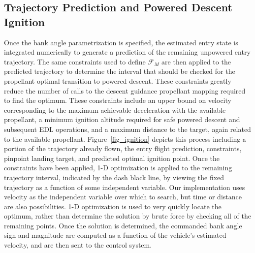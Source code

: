 \documentclass[letterpaper, preprint, paper,11pt]{AAS}
\begin{document}
\subsection{Trajectory Prediction and Powered Descent Ignition}
Once the bank angle parametrization is specified, the estimated entry state is integrated numerically to generate a prediction of the remaining unpowered entry trajectory. The same constraints used to define $\mathcal{F}_M$ are then applied to the predicted trajectory to determine the interval that should be checked for the propellant optimal transition to powered descent. These constraints greatly reduce the number of calls to the descent guidance propellant mapping required to find the optimum. These constraints include an upper bound on velocity corresponding to the maximum achievable deceleration with the available propellant, a minimum ignition altitude required for safe powered descent and subsequent EDL operations, and a maximum distance to the target, again related to the available propellant. Figure~\ref{fig_ignition} depicts this process including a portion of the trajectory already flown, the entry flight prediction, constraints, pinpoint landing target, and predicted optimal ignition point. Once the constraints have been applied, 1-D optimization is applied to the remaining trajectory interval, indicated by the dash black line, by viewing the fixed trajectory as a function of some independent variable. Our implementation uses velocity as the independent variable over which to search, but time or distance are also possibilities. 1-D optimization is used to very quickly locate the optimum, rather than determine the solution by brute force by checking all of the remaining points. Once the solution is determined, the commanded bank angle sign and magnitude are computed as a function of the vehicle's estimated velocity, and are then sent to the control system.


\end{document}
